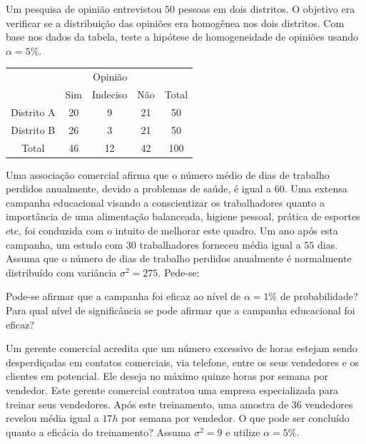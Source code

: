 \documentclass{report}
\begin{document}
\begin{Exercise}
\Question Um pesquisa de opinião entrevistou $50$ pessoas em dois distritos. O objetivo era verificar se a distribuição das opiniões era homogênea nos dois distritos. 
Com base nos dados da tabela, teste a hipótese de homogeneidade de opiniões usando $\alpha=5\%.$

\begin{table}[H]
\centering
\begin{tabular}{ccccc}
\hline \hline
                                      &\multicolumn{3}{c}{Opinião}&            \\
																			\cline{2-4}
                                      &Sim&Indeciso&Não             & Total  \\
\hline\hline
Distrito A           & 20           &9 & 21 & 50      \\
Distrito B           & 26           &3 & 21 & 50     \\
\hline
Total                  & 46           &12 &42&100    \\
\hline \hline
\end{tabular}
\end{table}

\Question Uma associação comercial afirma que o número médio de dias de trabalho perdidos anualmente, devido a problemas de saúde, é igual a 60. Uma extensa 
campanha educacional visando a conscientizar os trabalhadores quanto a importância de uma alimentação balanceada, higiene pessoal, prática de esportes 
etc, foi conduzida com o intuito de melhorar este quadro. Um ano após esta campanha, um estudo com $30$ trabalhadores forneceu média igual a $55$ dias. Assuma 
que o número de dias de trabalho perdidos anualmente é normalmente distribuído com variância $\sigma^{2}=275$. Pede-se:
\begin{tasks}
\task Pode-se afirmar que a campanha foi eficaz ao nível de $\alpha=1\%$ de probabilidade?
\task Para qual nível de significância se pode afirmar que a campanha educacional foi eficaz?
\end{tasks}

\Question Um gerente comercial acredita que um número excessivo de horas estejam sendo desperdiçadas em contatos comerciais, via telefone, entre os seus 
vendedores e os clientes em potencial. Ele deseja no máximo quinze horas por semana por vendedor. Este gerente comercial contratou uma empresa especializada 
para treinar seus vendedores. Após este treinamento, uma amostra de $36$ vendedores revelou média igual a $17h$ por semana por vendedor. O que pode ser concluído 
quanto a eficácia do treinamento? Assuma $\sigma^{2}=9$ e utilize $\alpha=5\%.$


\end{Exercise}
\end{document}
